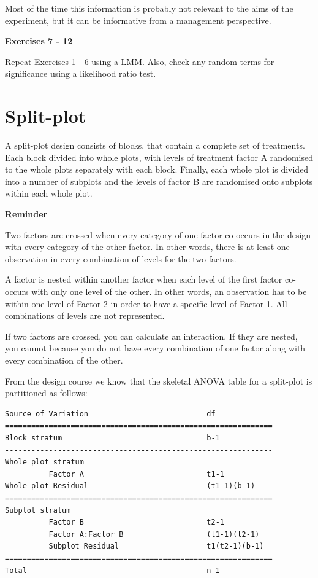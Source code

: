 \documentclass[a4paper, 10pt, fleqn, twosided]{memoir}
\begin{document}
Most of the time this information is probably not relevant to the aims of the experiment, but it can be informative
from a management perspective.

\textbf{Exercises 7 - 12}


Repeat Exercises 1 - 6 using a LMM. Also, check any random terms for significance using a likelihood ratio test.

\clearpage
\section{Split-plot}

A split-plot design consists of blocks, that contain a complete set of treatments.  Each block divided into whole
plots, with levels of treatment factor A randomised to the whole plots separately with each block. Finally, each whole
plot is divided into a number of subplots and the levels of factor B are randomised onto subplots within each whole
plot.

\textbf{Reminder}

Two factors are crossed when every category of one factor co-occurs in the
design with every category of the other factor. In other words, there is at
least one observation in every combination of levels for the two factors.

A factor is nested within another factor when each level of the first factor
co-occurs with only one level of the other. In other words, an observation has
to be within one level of Factor 2 in order to have a specific level of Factor
1. All combinations of levels are not represented.

If two factors are crossed, you can calculate an interaction. If they are
nested, you cannot because you do not have every combination of one factor
along with every combination of the other.




From the design course we know that the skeletal ANOVA table for a split-plot is partitioned as follows:

\begin{verbatim}
Source of Variation                           df
=============================================================
Block stratum                                 b-1
-------------------------------------------------------------
Whole plot stratum
          Factor A                            t1-1
Whole plot Residual                           (t1-1)(b-1)
=============================================================
Subplot stratum
          Factor B                            t2-1
          Factor A:Factor B                   (t1-1)(t2-1)
          Subplot Residual                    t1(t2-1)(b-1)
=============================================================
Total                                         n-1
\end{verbatim}
\end{document}
